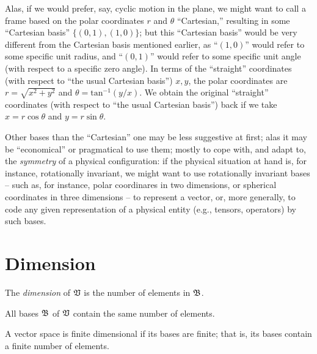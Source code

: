 Alas, if we would prefer, say, cyclic motion in the plane,
we might want to call a frame based on the polar coordinates $r$ and $\theta$ ``Cartesian,''
resulting in some ``Cartesian basis'' $\{(0,1),(1,0)\}$;
but this ``Cartesian basis'' would be very different from the Cartesian
basis mentioned earlier,
as ``$(1,0)$'' would refer to some specific unit radius,
and ``$(0,1)$'' would refer to some specific unit angle (with respect to a specific zero angle).
In terms of the ``straight'' coordinates (with respect to ``the usual Cartesian basis'')
$x,y$, the polar coordinates are $r = \sqrt{x^2+y^2}$ and $\theta = \mathrm{tan}^{-1} (y/x)$.
We obtain the original ``straight'' coordinates (with respect to ``the usual Cartesian basis'')
back if we take
$x=r\cos \theta$
and
$y=r\sin \theta$.

Other bases than the ``Cartesian'' one may be less suggestive at first; alas it may be ``economical'' or pragmatical to use them;
mostly to cope with, and adapt to, the {\em symmetry} of a physical configuration:
if the physical situation at hand is, for instance, rotationally invariant,
we might want to use rotationally invariant bases --
such as, for instance, polar coordinares in two dimensions, or spherical coordinates in three dimensions --
to represent a vector, or, more generally, to code any given representation of a physical entity
(e.g., tensors, operators) by such bases.


\section{Dimension}
The {\em dimension}
of $\frak V$ is the number of elements in $\frak B$.

All bases $\frak B$ of $\frak V$ contain the same number of elements.

A vector space is finite dimensional if its bases are finite; that is, its bases
contain a finite number of elements.

